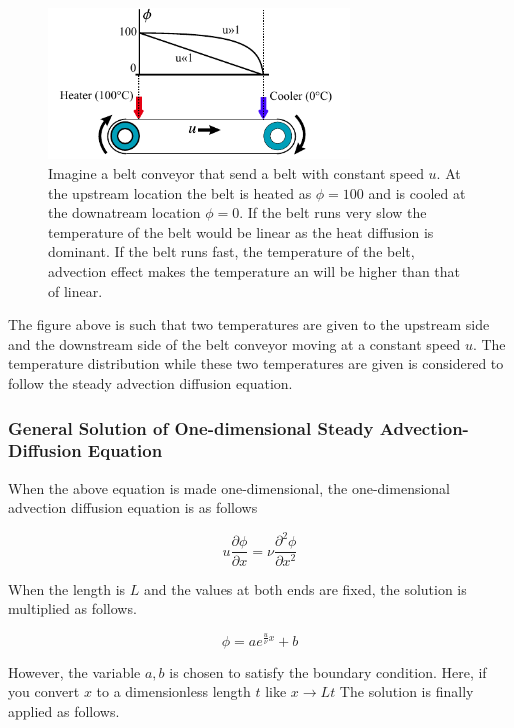 \begin{figure}[htbp!]
  \centering
  \includegraphics[width=80mm]{images/velt_convayer}
  \caption{Imagine a belt conveyor that send a belt with constant speed $u$. At the upstream location the belt is heated as $\phi=100$ and is cooled at the downatream location $\phi=0$. If the belt runs very slow the temperature of the belt would be linear as the heat diffusion is dominant. If the belt runs fast, the temperature of the belt, advection effect makes the temperature an will be higher than that of linear. }
  \label{fig:lap_domain}
\end{figure}

The figure above is such that two temperatures are given to the upstream side and the downstream side of the belt conveyor moving at a constant speed $u$. The temperature distribution while these two temperatures are given is considered to follow the steady advection diffusion equation.


\subsubsection{General Solution of One-dimensional Steady Advection-Diffusion Equation}
When the above equation is made one-dimensional, the one-dimensional advection diffusion equation is as follows

\begin{equation}
u\frac{\partial \phi}{\partial x}=\nu\frac{\partial^2 \phi}{\partial x^2}
\end{equation}

When the length is $L$ and the values ​​at both ends are fixed, the solution is multiplied as follows.

\begin{equation}
\phi=a e^{\frac{u}{\nu}x}+b
\end{equation}

However, the variable $a,b$ is chosen to satisfy the boundary condition.
Here, if you convert $x$ to a dimensionless length $t$ like $x \rightarrow Lt$
The solution is finally applied as follows.

